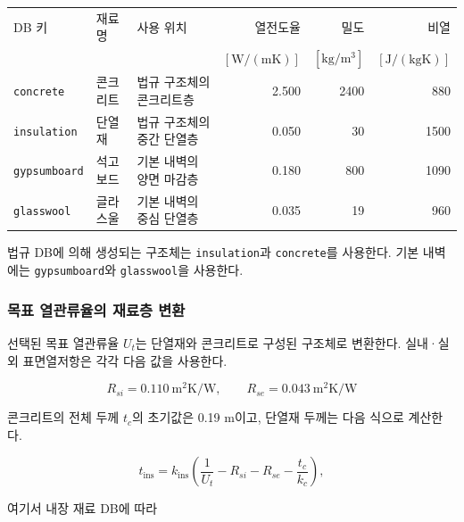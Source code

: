 \begin{defaulttable}
  \caption{\simulator 의 내장 기본 재료 DB}
  \label{tbl:default-materials}
  {\small
  \begin{tabular}{lllrrr}
    \toprule
    DB 키 & 재료명 & 사용 위치
      & 열전도율
      & 밀도
      & 비열 \\
    & & &
      $[\mathrm{W/(mK)}]$
      & $[\mathrm{kg/m^3}]$
      & $[\mathrm{J/(kgK)}]$ \\ \midrule
    \texttt{concrete}
      & 콘크리트
      & 법규 구조체의 콘크리트층
      & 2.500 & 2400 & 880 \\

    \texttt{insulation}
      & 단열재
      & 법규 구조체의 중간 단열층
      & 0.050 & 30 & 1500 \\

    \texttt{gypsumboard}
      & 석고보드
      & 기본 내벽의 양면 마감층
      & 0.180 & 800 & 1090 \\

    \texttt{glasswool}
      & 글라스울
      & 기본 내벽의 중심 단열층
      & 0.035 & 19 & 960 \\
    \bottomrule
  \end{tabular}
  }
\end{defaulttable}

법규 DB에 의해 생성되는 구조체는 \texttt{insulation}과 \texttt{concrete}를 사용한다. 기본 내벽에는 \texttt{gypsumboard}와 \texttt{glasswool}을 사용한다.

\subsubsection{목표 열관류율의 재료층 변환}

선택된 목표 열관류율 $U_t$는 단열재와 콘크리트로 구성된 구조체로 변환한다. 실내·실외 표면열저항은 각각 다음 값을 사용한다.

\[
  R_{si}=0.110\ \mathrm{m^2K/W},
  \qquad
  R_{se}=0.043\ \mathrm{m^2K/W}
\]

콘크리트의 전체 두께 $t_c$의 초기값은 0.19 m이고, 단열재 두께는 다음 식으로 계산한다.

\begin{equation}
  t_{\mathrm{ins}}
  =
  k_{\mathrm{ins}}
  \left(
    \frac{1}{U_t}
    -
    R_{si}
    -
    R_{se}
    -
    \frac{t_c}{k_c}
  \right),
  \label{eq:unknown-insulation-thickness}
\end{equation}

여기서 내장 재료 DB에 따라


